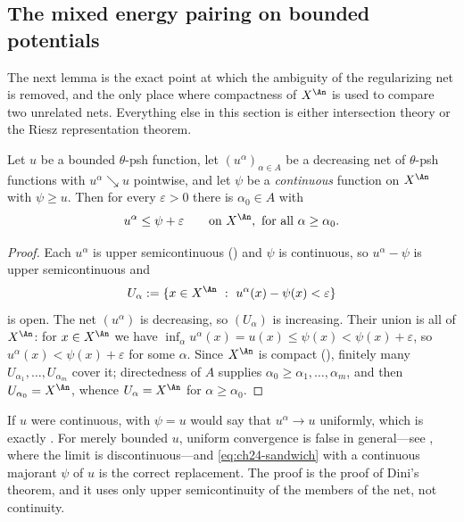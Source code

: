 \subsection{The mixed energy pairing on bounded potentials}
\label{sec:ch24-energy-bounded}

The next lemma is the exact point at which the ambiguity of the regularizing
net is removed, and the only place where compactness of \(X^{\An}\) is used
to compare two unrelated nets.  Everything else in this section is either
intersection theory or the Riesz representation theorem.

\begin{lemma}
\label{lem:ch24-sandwich}
Let \(u\) be a bounded \(\theta\)-psh function, let
\((u^\alpha)_{\alpha\in A}\) be a decreasing net of \(\theta\)-psh functions
with \(u^\alpha\searrow u\) pointwise, and let \(\psi\) be a
\emph{continuous} function on \(X^{\An}\) with \(\psi\geq u\).  Then for
every \(\varepsilon>0\) there is \(\alpha_0\in A\) with
\begin{equation}
\label{eq:ch24-sandwich}
       u^{\alpha}\leq\psi+\varepsilon
       \qquad\text{on }X^{\An},\ \text{for all }\alpha\geq\alpha_0 .
\end{equation}
\end{lemma}

\begin{proof}
Each \(u^\alpha\) is upper semicontinuous
() and \(\psi\) is continuous, so
\(u^\alpha-\psi\) is upper semicontinuous and
\[
 U_\alpha:=\{x\in X^{\An}\ :\ u^\alpha(x)-\psi(x)<\varepsilon\}
\]
is open.  The net \((u^\alpha)\) is decreasing, so \((U_\alpha)\) is
increasing.  Their union is all of \(X^{\An}\): for \(x\in X^{\An}\) we have
\(\inf_\alpha u^\alpha(x)=u(x)\leq\psi(x)<\psi(x)+\varepsilon\), so
\(u^{\alpha}(x)<\psi(x)+\varepsilon\) for some \(\alpha\).  Since
\(X^{\An}\) is compact (), finitely many
\(U_{\alpha_1},\ldots,U_{\alpha_m}\) cover it; directedness of \(A\) supplies
\(\alpha_0\geq\alpha_1,\ldots,\alpha_m\), and then
\(U_{\alpha_0}=X^{\An}\), whence \(U_\alpha=X^{\An}\) for
\(\alpha\geq\alpha_0\).
\end{proof}

\begin{remark}
\label{rem:ch24-dini-form}
If \(u\) were continuous,  with \(\psi=u\) would say
that \(u^\alpha\to u\) uniformly, which is exactly
.  For merely bounded \(u\), uniform convergence is
false in general---see , where the limit is
discontinuous---and \eqref{eq:ch24-sandwich} with a continuous majorant
\(\psi\) of \(u\) is the correct replacement.  The proof is the proof of
Dini's theorem, and it uses only upper semicontinuity of the members of the
net, not continuity.
\end{remark}

